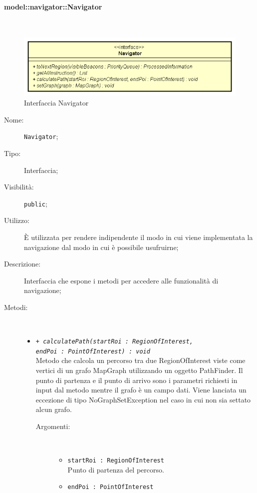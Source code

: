 \documentclass[../DefinizioneDiProdotto.tex]{subfiles}
\begin{document}
\paragraph{model::navigator::Navigator}
\
\begin{figure}[H]
	\centering
	\includegraphics[width=\maxwidth]{img/Navigator.png}
	\caption{Interfaccia Navigator}\label{fig:model::navigator::Navigator} 
\end{figure}
\begin{description}
	\item[Nome:] \texttt{Navigator};
	\item[Tipo:] Interfaccia;
	\item[Visibilità:] \texttt{public};
	\item[Utilizzo:] È utilizzata per rendere indipendente il modo in cui viene implementata la navigazione dal modo in cui è possibile usufruirne;
	\item[Descrizione:] Interfaccia che espone i metodi per accedere alle funzionalità di navigazione;
	\item[Metodi:] \
	\begin{itemize}
		\item \texttt{+ \textit{calculatePath(startRoi : RegionOfInterest, \\ endPoi : PointOfInterest) : void}}\\
		Metodo che calcola un percorso tra due RegionOfInterest viste come vertici di un grafo MapGraph utilizzando un oggetto PathFinder. Il punto di partenza e il punto di arrivo sono i parametri richiesti in input dal metodo mentre il grafo è un campo dati. Viene lanciata un eccezione di tipo NoGraphSetException nel caso in cui non sia settato alcun grafo.
		\begin{description}
			\item[Argomenti:] \
			\begin{itemize}
				\item \texttt{startRoi : RegionOfInterest}\\
				Punto di partenza del percorso.\item \texttt{endPoi : PointOfInterest}\\

\end{itemize}
\end{description}
\end{itemize}
\end{description}
\end{document}
